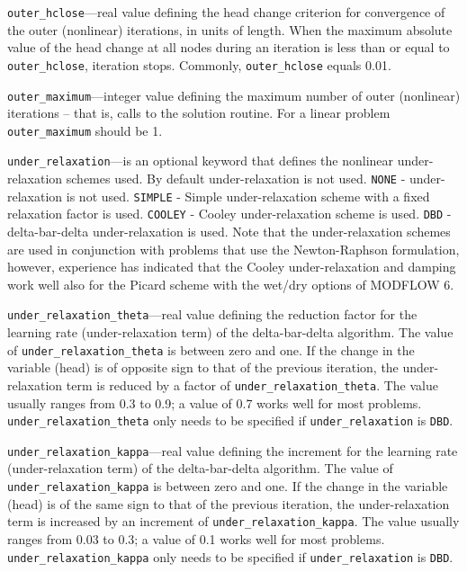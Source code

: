 \begin{description}
\item \texttt{outer\_hclose}---real value defining the head change criterion for convergence of the outer (nonlinear) iterations, in units of length. When the maximum absolute value of the head change at all nodes during an iteration is less than or equal to \texttt{outer\_hclose}, iteration stops. Commonly, \texttt{outer\_hclose} equals 0.01.

\item \texttt{outer\_maximum}---integer value defining the maximum number of outer (nonlinear) iterations -- that is, calls to the solution routine. For a linear problem \texttt{outer\_maximum} should be 1.

\item \texttt{under\_relaxation}---is an optional keyword that defines the nonlinear under-relaxation schemes used. By default under-relaxation is not used.  \texttt{NONE} - under-relaxation is not used. \texttt{SIMPLE} - Simple under-relaxation scheme with a fixed relaxation factor is used.  \texttt{COOLEY} - Cooley under-relaxation scheme is used.  \texttt{DBD} - delta-bar-delta under-relaxation is used.  Note that the under-relaxation schemes are used in conjunction with problems that use the Newton-Raphson formulation, however, experience has indicated that the Cooley under-relaxation and damping work well also for the Picard scheme with the wet/dry options of MODFLOW 6.

\item \texttt{under\_relaxation\_theta}---real value defining the reduction factor for the learning rate (under-relaxation term) of the delta-bar-delta algorithm. The value of \texttt{under\_relaxation\_theta} is between zero and one. If the change in the variable (head) is of opposite sign to that of the previous iteration, the under-relaxation term is reduced by a factor of \texttt{under\_relaxation\_theta}. The value usually ranges from 0.3 to 0.9; a value of 0.7 works well for most problems. \texttt{under\_relaxation\_theta} only needs to be specified if \texttt{under\_relaxation} is \texttt{DBD}.

\item \texttt{under\_relaxation\_kappa}---real value defining the increment for the learning rate (under-relaxation term) of the delta-bar-delta algorithm. The value of \texttt{under\_relaxation\_kappa} is between zero and one. If the change in the variable (head) is of the same sign to that of the previous iteration, the under-relaxation term is increased by an increment of \texttt{under\_relaxation\_kappa}. The value usually ranges from 0.03 to 0.3; a value of 0.1 works well for most problems. \texttt{under\_relaxation\_kappa} only needs to be specified if \texttt{under\_relaxation} is \texttt{DBD}.


\end{description}
